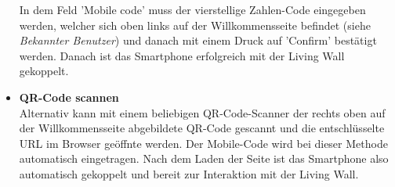 \documentclass[10pt,a4paper]{report}
\begin{document}
\begin{itemize}
\begin{center}
				\end{center}
				In dem Feld 'Mobile code' muss der vierstellige Zahlen-Code eingegeben werden, welcher sich oben links auf der Willkommensseite befindet (siehe \textit{Bekannter Benutzer}) und danach mit einem Druck auf 'Confirm' bestätigt werden. Danach ist das Smartphone erfolgreich mit der Living Wall gekoppelt. \\
				\item \textbf{QR-Code scannen}\\
				Alternativ kann mit einem beliebigen QR-Code-Scanner der rechts oben auf der Willkommensseite abgebildete QR-Code gescannt und die entschlüsselte URL im Browser geöffnte werden. Der Mobile-Code wird bei dieser Methode automatisch eingetragen. Nach dem Laden der Seite ist das Smartphone also automatisch gekoppelt und bereit zur Interaktion mit der Living Wall.
			\end{itemize}
\end{document}

